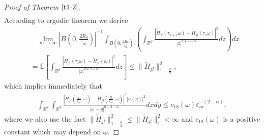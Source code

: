 \documentclass[11pt,draft, reqno]{amsart}
\renewcommand{\le}{\leqslant}
\newcommand{\R}{\mathds R}
\newcommand{\e}{\varepsilon}
\newcommand{\Ee}{\mathds E}
\newcommand{\w}{\omega}
\theoremstyle{definition}
\numberwithin{equation}{section}
\begin{document}
\begin{proof} [Proof of Theorem $\ref{t1-2}$]
\begin{align*}
\end{align*}
According to ergodic theorem we derive
\begin{equation}\label{t2-1-8}
\begin{split}
&\quad \lim_{m \to \infty}\left|B\left(0,\frac{2R_0}{\e_m}\right)\right|^{-1}\int_{B\left(0,\frac{2R_0}{\e_m}\right)}
\left(\int_{\R^d}\frac{\left|\tilde H_{jl}(\tau_{x+z}\w)-\tilde H_{jl}(\tau_{x}\w)\right|^2}{|z|^{d+2-\alpha}}dz\right)dx\\
&=\Ee\left[\int_{\R^d}\frac{\left|\tilde H_{jl}(\tau_z \w)-\tilde H_{jl}(\w)\right|^2}{|z|^{d+2-\alpha}}dz\right]
\le \|\tilde H_{jl}\|_{1-\frac{\alpha}{2}}^2,
\end{split}
\end{equation}
which implies immediately that
\begin{align*}
\int_{\R^d}\int_{\R^d}\frac{\left|H_{jl}\left(\frac{x}{\e_m};\w\right)-H_{jl}\left(\frac{y}{\e_m};\w\right)\right|^2|h(y)|^2}{|x-y|^{d+2-\alpha}}dxdy
\le c_{18}(\w)\e_m^{-(2-\alpha)},
\end{align*}
where we also use the fact $\|\tilde H_{jl}\|_{1-\frac{\alpha}{2}}^2\le\|\tilde H_{jl}\|_{1}^2<\infty$ and $c_{18}(\w)$
is a positive constant which may depend on $\w$.


\end{proof}
\end{document}
